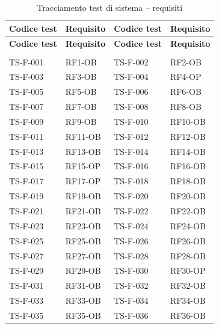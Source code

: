 \documentclass[a4paper,12pt]{article}
\begin{document}
{\footnotesize
\renewcommand{\arraystretch}{1.1}
\begin{longtable}{|p{2.5cm}|p{2.2cm}|p{2.5cm}|p{2.2cm}|}
    \caption{Tracciamento test di sistema -- requisiti} \label{tab:tracciamento-ts} \\
    \hline
    \rowcolor{gray!20}
    \textbf{Codice test} & \textbf{Requisito} & \textbf{Codice test} & \textbf{Requisito} \\
    \hline
    \endfirsthead
    \hline
    \rowcolor{gray!20}
    \textbf{Codice test} & \textbf{Requisito} & \textbf{Codice test} & \textbf{Requisito} \\
    \hline
    \endhead
    \hline
    \endfoot
    \hline
    \endlastfoot
    \multicolumn{4}{|l|}{\cellcolor{gray!12}\textbf{Funzionali}} \\
    \hline
    TS-F-001 & RF1-OB & TS-F-002 & RF2-OB \\
    \hline
    TS-F-003 & RF3-OB & TS-F-004 & RF4-OP \\
    \hline
    TS-F-005 & RF5-OB & TS-F-006 & RF6-OB \\
    \hline
    TS-F-007 & RF7-OB & TS-F-008 & RF8-OB \\
    \hline
    TS-F-009 & RF9-OB & TS-F-010 & RF10-OB \\
    \hline
    TS-F-011 & RF11-OB & TS-F-012 & RF12-OB \\
    \hline
    TS-F-013 & RF13-OB & TS-F-014 & RF14-OB \\
    \hline
    TS-F-015 & RF15-OP & TS-F-016 & RF16-OB \\
    \hline
    TS-F-017 & RF17-OP & TS-F-018 & RF18-OB \\
    \hline
    TS-F-019 & RF19-OB & TS-F-020 & RF20-OB \\
    \hline
    TS-F-021 & RF21-OB & TS-F-022 & RF22-OB \\
    \hline
    TS-F-023 & RF23-OB & TS-F-024 & RF24-OB \\
    \hline
    TS-F-025 & RF25-OB & TS-F-026 & RF26-OB \\
    \hline
    TS-F-027 & RF27-OB & TS-F-028 & RF28-OB \\
    \hline
    TS-F-029 & RF29-OB & TS-F-030 & RF30-OP \\
    \hline
    TS-F-031 & RF31-OB & TS-F-032 & RF32-OB \\
    \hline
    TS-F-033 & RF33-OB & TS-F-034 & RF34-OB \\
    \hline
    TS-F-035 & RF35-OB & TS-F-036 & RF36-OB \\

\end{longtable}}
\end{document}
